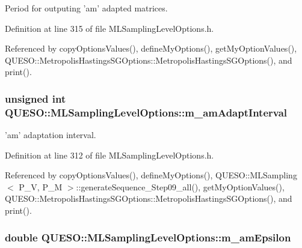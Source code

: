 Period for outputing 'am' adapted matrices. 



Definition at line 315 of file M\-L\-Sampling\-Level\-Options.\-h.



Referenced by copy\-Options\-Values(), define\-My\-Options(), get\-My\-Option\-Values(), Q\-U\-E\-S\-O\-::\-Metropolis\-Hastings\-S\-G\-Options\-::\-Metropolis\-Hastings\-S\-G\-Options(), and print().

\hypertarget{class_q_u_e_s_o_1_1_m_l_sampling_level_options_abf7bc1e5bb55727e5c92bec2e49974a6}{
\subsubsection[{m\-\_\-am\-Adapt\-Interval}]{\setlength{\rightskip}{0pt plus 5cm}unsigned int Q\-U\-E\-S\-O\-::\-M\-L\-Sampling\-Level\-Options\-::m\-\_\-am\-Adapt\-Interval}}\label{class_q_u_e_s_o_1_1_m_l_sampling_level_options_abf7bc1e5bb55727e5c92bec2e49974a6}


'am' adaptation interval. 



Definition at line 312 of file M\-L\-Sampling\-Level\-Options.\-h.



Referenced by copy\-Options\-Values(), define\-My\-Options(), Q\-U\-E\-S\-O\-::\-M\-L\-Sampling$<$ P\-\_\-\-V, P\-\_\-\-M $>$\-::generate\-Sequence\-\_\-\-Step09\-\_\-all(), get\-My\-Option\-Values(), Q\-U\-E\-S\-O\-::\-Metropolis\-Hastings\-S\-G\-Options\-::\-Metropolis\-Hastings\-S\-G\-Options(), and print().

\hypertarget{class_q_u_e_s_o_1_1_m_l_sampling_level_options_abf07f60a5115657e18d39a586a8093ac}{
\subsubsection[{m\-\_\-am\-Epsilon}]{\setlength{\rightskip}{0pt plus 5cm}double Q\-U\-E\-S\-O\-::\-M\-L\-Sampling\-Level\-Options\-::m\-\_\-am\-Epsilon}}\label{class_q_u_e_s_o_1_1_m_l_sampling_level_options_abf07f60a5115657e18d39a586a8093ac}


